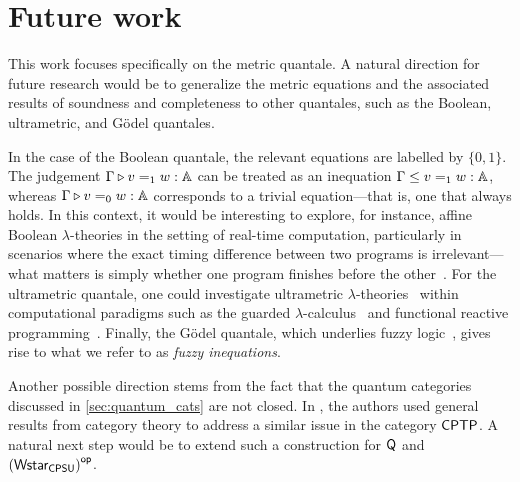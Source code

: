 \chapter{Future work}\label{ch:future_work}


This work focuses specifically on the metric quantale. A natural direction for future research would be to generalize the metric equations and the associated results of soundness and completeness to other quantales, such as the Boolean, ultrametric, and Gödel quantales.

In the case of the Boolean quantale, the relevant equations are labelled by $\{0,1\}$. The judgement $\Gamma \triangleright v =_{1} w : \mathbb{A}$ can be  treated as an inequation $\Gamma \leq v =_{1} w : \mathbb{A}$, whereas $\Gamma \triangleright v =_{0} w : \mathbb{A}$ corresponds to a trivial equation---that is, one that always holds. In this context, it would be interesting to explore, for instance, affine Boolean $\lambda$-theories in the setting of real-time computation, particularly in scenarios where the exact timing difference between two programs is irrelevant---what matters is simply whether one program finishes before the other~\cite{dahlqvist2023syntactic}. For the ultrametric quantale, one could investigate ultrametric $\lambda$-theories~\cite{dahlqvist2023syntactic} within computational paradigms such as the guarded $\lambda$-calculus~\cite{guarded_ultrametric} and functional reactive programming~\cite{Ultrametric_reactive}. Finally, the Gödel quantale, which underlies fuzzy logic~\cite{deneckeGaloisConnectionsApplications2004}, gives rise to what we refer to as \emph{fuzzy inequations}.









Another possible direction stems from the fact that the quantum categories discussed in \autoref{sec:quantum_cats} are not closed. In \cite{dahlqvist2023syntactic}, the authors used general results from category theory to address a similar issue in the category $\mathsf{CPTP}$. A natural next step would be to extend such a construction for $\mathsf{Q}$ and $\left(\mathsf{Wstar_{CPSU}}\right)^{\mathsf{op}}$.



